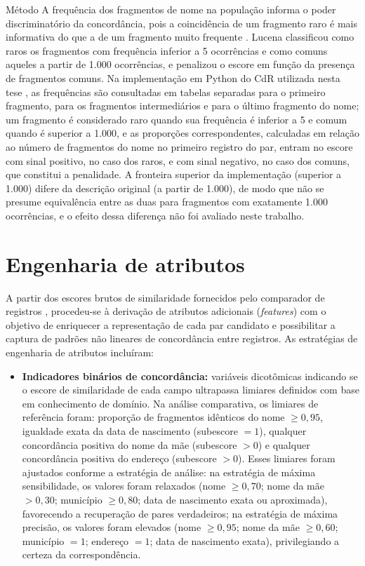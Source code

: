\begin{chapter}{Método}
A frequência dos fragmentos de nome na população informa o poder discriminatório da concordância, pois a coincidência de um fragmento raro é mais informativa do que a de um fragmento muito frequente \cite{Lucena2013algoritmos}. Lucena \citeyearpar{Lucena2013algoritmos} classificou como raros os fragmentos com frequência inferior a 5 ocorrências e como comuns aqueles a partir de 1.000 ocorrências, e penalizou o escore em função da presença de fragmentos comuns. Na implementação em Python do CdR utilizada nesta tese \cite{Jardim2024comparador}, as frequências são consultadas em tabelas separadas para o primeiro fragmento, para os fragmentos intermediários e para o último fragmento do nome; um fragmento é considerado raro quando sua frequência é inferior a 5 e comum quando é superior a 1.000, e as proporções correspondentes, calculadas em relação ao número de fragmentos do nome no primeiro registro do par, entram no escore com sinal positivo, no caso dos raros, e com sinal negativo, no caso dos comuns, que constitui a penalidade. A fronteira superior da implementação (superior a 1.000) difere da descrição original (a partir de 1.000), de modo que não se presume equivalência entre as duas para fragmentos com exatamente 1.000 ocorrências, e o efeito dessa diferença não foi avaliado neste trabalho.

\section{Engenharia de atributos}\label{sec:engenharia-atributos}

A partir dos escores brutos de similaridade fornecidos pelo comparador de registros \cite{Jardim2024comparador}, procedeu-se à derivação de atributos adicionais (\textit{features}) com o objetivo de enriquecer a representação de cada par candidato e possibilitar a captura de padrões não lineares de concordância entre registros. As estratégias de engenharia de atributos incluíram:

\begin{sloppypar}
\begin{itemize}
\item \textbf{Indicadores binários de concordância:} variáveis dicotômicas indicando se o escore de similaridade de cada campo ultrapassa limiares definidos com base em conhecimento de domínio. Na análise comparativa, os limiares de referência foram: proporção de fragmentos idênticos do nome $\geq 0{,}95$, igualdade exata da data de nascimento (subescore $= 1$), qualquer concordância positiva do nome da mãe (subescore $> 0$) e qualquer concordância positiva do endereço (subescore $> 0$). Esses limiares foram ajustados conforme a estratégia de análise: na estratégia de máxima sensibilidade, os valores foram relaxados (nome $\geq 0{,}70$; nome da mãe $> 0{,}30$; município $\geq 0{,}80$; data de nascimento exata ou aproximada), favorecendo a recuperação de pares verdadeiros; na estratégia de máxima precisão, os valores foram elevados (nome $\geq 0{,}95$; nome da mãe $\geq 0{,}60$; município $= 1$; endereço $= 1$; data de nascimento exata), privilegiando a certeza da correspondência.


\end{itemize}
\end{sloppypar}
\end{chapter}
